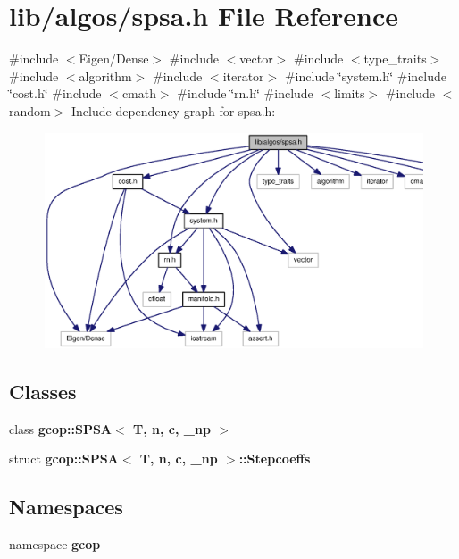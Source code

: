 \section{lib/algos/spsa.h \-File \-Reference}
\label{spsa_8h}
{\ttfamily \#include $<$\-Eigen/\-Dense$>$}\*
{\ttfamily \#include $<$vector$>$}\*
{\ttfamily \#include $<$type\-\_\-traits$>$}\*
{\ttfamily \#include $<$algorithm$>$}\*
{\ttfamily \#include $<$iterator$>$}\*
{\ttfamily \#include \char`\"{}system.\-h\char`\"{}}\*
{\ttfamily \#include \char`\"{}cost.\-h\char`\"{}}\*
{\ttfamily \#include $<$cmath$>$}\*
{\ttfamily \#include \char`\"{}rn.\-h\char`\"{}}\*
{\ttfamily \#include $<$limits$>$}\*
{\ttfamily \#include $<$random$>$}\*
\-Include dependency graph for spsa.\-h\-:\nopagebreak
\begin{figure}[H]
\begin{center}
\leavevmode
\includegraphics[width=350pt]{spsa_8h__incl}
\end{center}
\end{figure}
\subsection*{\-Classes}
\begin{DoxyCompactItemize}
\item 
class {\bf gcop\-::\-S\-P\-S\-A$<$ T, n, c, \-\_\-np $>$}
\item 
struct {\bf gcop\-::\-S\-P\-S\-A$<$ T, n, c, \-\_\-np $>$\-::\-Stepcoeffs}
\end{DoxyCompactItemize}
\subsection*{\-Namespaces}
\begin{DoxyCompactItemize}
\item 
namespace {\bf gcop}
\end{DoxyCompactItemize}
